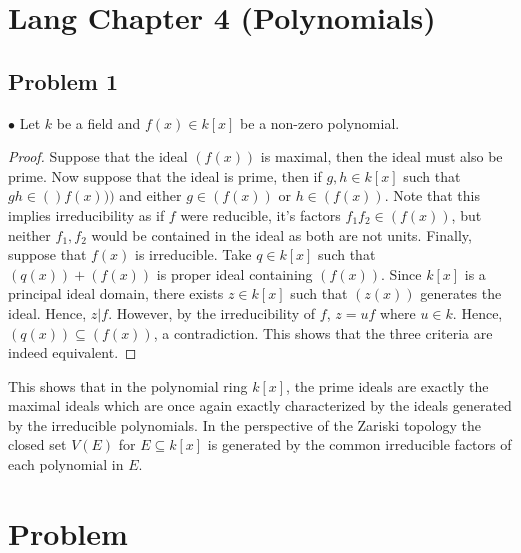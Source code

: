 \documentclass[Lang.tex]{subfiles}
\begin{document}
\section*{Lang Chapter 4 (Polynomials)}

\subsection*{Problem 1}
	$\bullet$ Let $k$ be a field and $f(x) \in k[x]$ be a non-zero polynomial. 
	\begin{proof}
		Suppose that the ideal $(f(x))$ is maximal, then the ideal must also be prime. Now suppose that the ideal is prime, then if $g,h \in k[x]$ such that $gh \in ()f(x)))$ and either $g \in (f(x))$ or $h \in (f(x))$. Note that this implies irreducibility as if $f$ were reducible, it's factors $f_1f_2 \in (f(x))$, but neither $f_1,f_2$ would be contained in the ideal as both are not units. Finally, suppose that $f(x)$ is irreducible. Take $q \in k[x]$  such that $(q(x)) + (f(x))$ is proper ideal containing $(f(x))$. Since $k[x]$ is a principal ideal domain, there exists $z \in k[x]$ such that $(z(x))$ generates the ideal. Hence, $z|f$. However, by  the irreducibility of $f$, $z = uf$ where $u \in k$.  Hence, $(q(x)) \subseteq (f(x))$, a contradiction. This shows that the three criteria are indeed equivalent. 
	\end{proof}

	This shows that in the polynomial ring $k[x]$, the prime ideals are exactly the maximal ideals which are once again exactly characterized by the ideals generated by the irreducible polynomials. In the perspective of the Zariski topology the closed set $V(E)$ for $E \subseteq k[x]$ is generated by the common irreducible factors of each polynomial in $E$.

\section{Problem}
\end{document}
